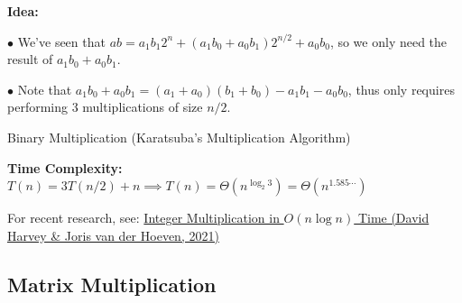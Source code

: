 \documentclass[10pt]{article}
\begin{document}
\textbf{Idea:}

$\bullet$ We've seen that $ab = a_1b_1 2^n + (a_1b_0+a_0b_1) 2^{n/2} + a_0b_0$, so we only need the result of $a_1b_0+a_0b_1$.

$\bullet$ Note that $a_1b_0+a_0b_1 = (a_1+a_0)(b_1+b_0) - a_1b_1 - a_0b_0$, thus only requires performing 3 multiplications of size $n/2$.

\begin{algorithm}
	\SetAlgoLined
	\caption{Binary Multiplication (Karatsuba's Multiplication Algorithm)}
\end{algorithm}

\textbf{Time Complexity:} $T(n) = 3T(n/2) + n\implies T(n) = \Theta(n^{\log_2 3}) = \Theta(n^{1.585\cdots})$

For recent research, see: \href{https://annals.math.princeton.edu/2021/193-2/p04}{Integer Multiplication in $O(n\log n)$ Time (David Harvey \& Joris van der Hoeven, 2021)}

\subsection{Matrix Multiplication}
\end{document}

